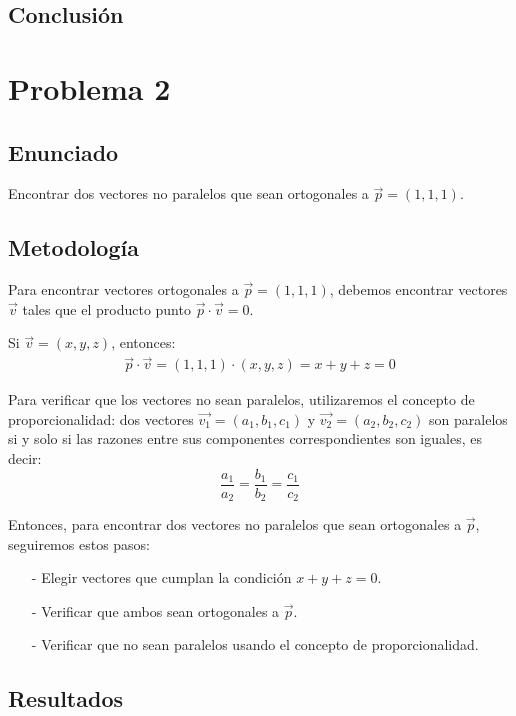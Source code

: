 \documentclass{article}
\begin{document}
\subsection{Conclusión}

\section{Problema 2}

\subsection{Enunciado}
Encontrar dos vectores no paralelos que sean ortogonales a $\vec{p} = (1, 1, 1)$.

\subsection{Metodología}

Para encontrar vectores ortogonales a $\vec{p} = (1, 1, 1)$, debemos encontrar vectores $\vec{v}$ tales que el producto punto $\vec{p} \cdot \vec{v} = 0$.

Si $\vec{v} = (x, y, z)$, entonces:
\begin{align}
\vec{p} \cdot \vec{v} = (1, 1, 1) \cdot (x, y, z) = x + y + z = 0
\end{align}

Para verificar que los vectores no sean paralelos, utilizaremos el concepto de proporcionalidad: dos vectores $\vec{v_1} = (a_1, b_1, c_1)$ y $\vec{v_2} = (a_2, b_2, c_2)$ son paralelos si y solo si las razones entre sus componentes correspondientes son iguales, es decir:
$$\frac{a_1}{a_2} = \frac{b_1}{b_2} = \frac{c_1}{c_2}$$

Entonces, para encontrar dos vectores no paralelos que sean ortogonales a $\vec{p}$, seguiremos estos pasos:
\begin{enumerate}
    \item[-] Elegir vectores que cumplan la condición $x + y + z = 0$.
    \item[-] Verificar que ambos sean ortogonales a $\vec{p}$.
    \item[-] Verificar que no sean paralelos usando el concepto de proporcionalidad.
\end{enumerate}

\subsection{Resultados}
\setcounter{equation}{0}
\end{document}
